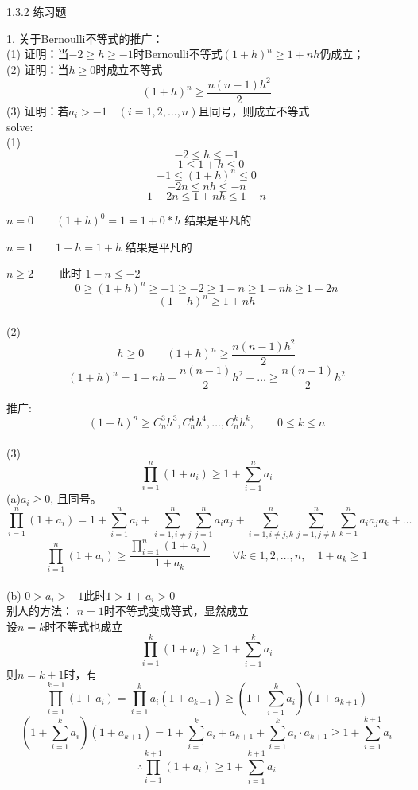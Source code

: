 \date{20.08.12}
1.3.2 练习题

1. 关于Bernoulli不等式的推广：
\\(1) 证明：当$ -2\ge h\ge -1 $时Bernoulli不等式$ (1+h)^n \ge 1+nh $仍成立；\\
(2) 证明：当$ h\ge 0 $时成立不等式 
\begin{equation}
	(1+h)^n\ge \frac{n(n-1)h^2}{2}
\end{equation} 
(3) 证明：若$ a_i>-1 \quad (i=1,2,\dots,n) $且同号，则成立不等式\\
solve:\\
(1)
\[ -2 \leq h \leq -1 \]
\[ -1 \leq 1+h \leq 0 \]
\[ -1 \leq (1+h)^n \leq 0 \]
\[ -2n \leq nh \leq -n \]
\[ 1-2n \leq 1+nh \leq 1-n \]

$ n=0 \qquad (1+h)^0 = 1 = 1+0*h $  结果是平凡的

$ n=1 \qquad 1+h = 1+h $ 结果是平凡的

$ n \geq 2 \qquad $ 此时 $ 1-n \leq -2 $
\[ 0 \geq (1+h)^n \geq -1 \geq -2 \geq 1-n \geq 1-nh \geq 1- 2n  \]
\[ (1+h)^n \geq 1+nh \]
\\
(2) 
\[ h\geq 0 \qquad (1+h)^n \geq \frac{n(n-1)h^2}{2} \]
\[ (1+h)^n=1+nh+\frac{n(n-1)}{2}h^2 + \dots \geq \frac{n(n-1)}{2}h^2  \]

推广:
\[ (1+h)^n \geq C_n^3 h^3, C_n^4 h^4, \dots , C_n^k h^k ,\qquad 0\leq k\leq n\]
\\
(3) 
\[ \prod_{i=1}^n (1+a_i)\ge 1+\sum_{i=1}^n a_i \]
(a)$ a_i \ge 0$, 且同号。 
\[ \prod_{i=1}^n (1+a_i) = 1+ \sum_{i=1}^n a_i + \sum_{i=1,i\neq j}^n \sum_{j=1}^n a_i a_j + \sum_{i=1,i\neq j,k}^n \sum_{j=1,j\neq k}^n \sum_{k=1}^n a_i a_j a_k+\dots \]
\[ \prod_{i=1}^n (1+a_i) \geq \frac{\prod_{i=1}^n(1+a_i)}{1+a_k} \qquad \forall k\in 1,2,\dots , n,\quad 1+a_k \geq 1 \]
\\
(b) $ 0 > a_i > -1 \text{此时} 1 > 1+a_i > 0$
\\别人的方法：
$ n=1 $时不等式变成等式，显然成立\\
设$ n=k $时不等式也成立
\[ \prod_{i=1}^k(1+a_i)\ge 1+\sum_{i=1}^k a_i\]
则$ n=k+1 $时，有
\[ \prod_{i=1}^{k+1}(1+a_i) = \prod_{i=1}^k a_i (1 + a_{k+1}) \ge (1+\sum_{i=1}^k a_i) (1+a_{k+1})\]
\[(1+\sum_{i=1}^k a_i) (1+a_{k+1})=1+\sum_{i=1}^k a_i + a_{k+1} + \sum_{i=1}^k a_i\cdot a_{k+1} \ge 1+\sum_{i=1}^{k+1} a_i \]
\[\therefore \prod_{i=1}^{k+1}(1+a_i)\ge 1+\sum_{i=1}^{k+1} a_i\]


